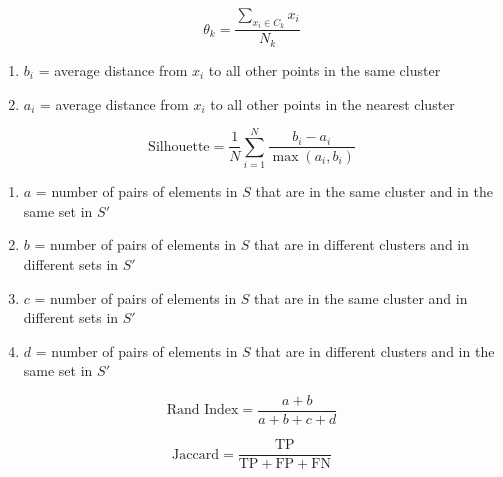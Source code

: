 \documentclass[10pt]{article}
\begin{document}
\begin{multicols}{2}
\begin{equation*}
    \theta_k = \frac{\sum_{x_i \in C_k}^{} x_i}{N_k}
\end{equation*}

\begin{enumerate}
    \item $b_i$ = average distance from $x_i$ to all other points in the same cluster
    \vspace*{-6pt}
    \item $a_i$ = average distance from $x_i$ to all other points in the nearest cluster
\end{enumerate}
\begin{equation*}
    \text{Silhouette} = \frac{1}{N} \sum_{i=1}^{N} \frac{b_i - a_i}{\max(a_i, b_i)}
\end{equation*}

\begin{enumerate}
    \item $a$ = number of pairs of elements in $S$ that are in the same cluster and in the same set in $S'$
    \vspace*{-6pt}
    \item $b$ = number of pairs of elements in $S$ that are in different clusters and in different sets in $S'$
    \vspace*{-6pt}
    \item $c$ = number of pairs of elements in $S$ that are in the same cluster and in different sets in $S'$
    \vspace*{-6pt}
    \item $d$ = number of pairs of elements in $S$ that are in different clusters and in the same set in $S'$
\end{enumerate}

\begin{equation*}
    \text{Rand Index} = \frac{a + b}{a + b + c + d}
\end{equation*}

\begin{equation*}
    \text{Jaccard} = \frac{\text{TP}}{\text{TP} + \text{FP} + \text{FN}}
\end{equation*}


\end{multicols}
\end{document}
